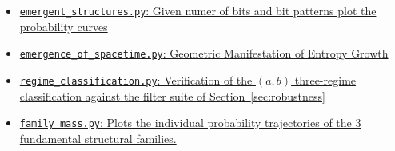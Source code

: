 \documentclass[11pt]{article}
\begin{document}
\begin{itemize}
\item \href{simulations/emergent\_structures.py}{\texttt{emergent\_structures.py}: Given numer of bits and bit patterns plot the probability curves}
\item \href{simulations/emergence_of_spacetime.py}{\texttt{emergence\_of\_spacetime.py}: Geometric Manifestation of Entropy Growth}
\item \href{simulations/regime_classification.py}{\texttt{regime\_classification.py}: Verification of the $(a,b)$ three-regime classification against the filter suite of Section~\ref{sec:robustness}}
\item \href{simulations/family_mass.py}{\texttt{family\_mass.py}: Plots the individual probability trajectories of the 3 fundamental structural families.}

\end{itemize}

\printbibliography
\end{document}
